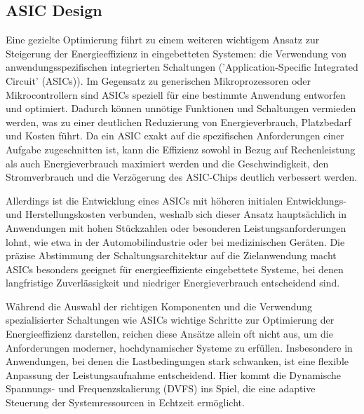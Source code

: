 \documentclass[footmark=none]{tubaf-thesis}
\begin{document}
    		\subsection{ASIC Design}
    			Eine gezielte Optimierung führt zu einem weiteren wichtigem Ansatz zur Steigerung der Energieeffizienz in eingebetteten Systemen: die Verwendung von anwendungsspezifischen integrierten Schaltungen ('Application-Specific Integrated Circuit' (ASICs)). Im Gegensatz zu generischen Mikroprozessoren oder Mikrocontrollern sind ASICs speziell für eine bestimmte Anwendung entworfen und optimiert. Dadurch können unnötige Funktionen und Schaltungen vermieden werden, was zu einer deutlichen Reduzierung von Energieverbrauch, Platzbedarf und Kosten führt. Da ein ASIC exakt auf die spezifischen Anforderungen einer Aufgabe zugeschnitten ist, kann die Effizienz sowohl in Bezug auf Rechenleistung als auch Energieverbrauch maximiert werden und die Geschwindigkeit, den Stromverbrauch und die Verzögerung des ASIC-Chips deutlich verbessert werden. \cite{10.1145/337292.337604} \cite{Matiieshyn2023} 
    			
    			Allerdings ist die Entwicklung eines ASICs mit höheren initialen Entwicklungs- und Herstellungskosten verbunden, weshalb sich dieser Ansatz hauptsächlich in Anwendungen mit hohen Stückzahlen oder besonderen Leistungsanforderungen lohnt, wie etwa in der Automobilindustrie oder bei medizinischen Geräten. Die präzise Abstimmung der Schaltungsarchitektur auf die Zielanwendung macht ASICs besonders geeignet für energieeffiziente eingebettete Systeme, bei denen langfristige Zuverlässigkeit und niedriger Energieverbrauch entscheidend sind. \cite{Matiieshyn2023}
    			
    			Während die Auswahl der richtigen Komponenten und die Verwendung spezialisierter Schaltungen wie ASICs wichtige Schritte zur Optimierung der Energieeffizienz darstellen, reichen diese Ansätze allein oft nicht aus, um die Anforderungen moderner, hochdynamischer Systeme zu erfüllen. Insbesondere in Anwendungen, bei denen die Lastbedingungen stark schwanken, ist eine flexible Anpassung der Leistungsaufnahme entscheidend. Hier kommt die Dynamische Spannungs- und Frequenzskalierung (DVFS) ins Spiel, die eine adaptive Steuerung der Systemressourcen in Echtzeit ermöglicht.
\end{document}
